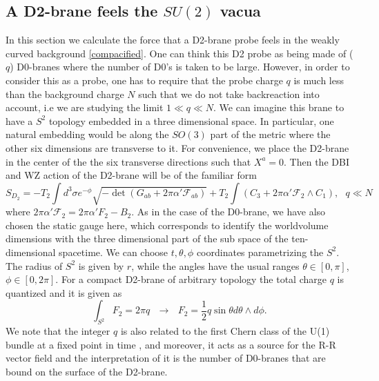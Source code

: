 \documentclass[11pt,english]{article}
\newcommand{\be}{\begin{equation}}
\newcommand{\ee}{\end{equation}}
\numberwithin{equation}{section}
\begin{document}
\subsection{A D2-brane feels the $SU(2)$ vacua}\label{D2analysis}
In this section we calculate the force that a D2-brane probe feels in the weakly curved background \eqref{compacified}. One can think this D2 probe as being made of ($q$) D0-branes where the number of D0's is taken to be large. However, in order to consider this as a probe, one has to require that the probe charge $q$ is much less than the background charge $N$ such that we do not take backreaction into account, i.e we are studying the limit $1\ll q\ll N$. We can imagine this brane to have a $S^2$ topology embedded in a three dimensional space. In particular, one natural embedding would be along the $SO(3)$ part of the metric where the other six dimensions are transverse to it. For convenience, we place the D2-brane in the center of the the six transverse directions such that $X^a=0$. Then the DBI and WZ action of the D2-brane will be of the familiar form 
\be \label{D2action}
S_{D_2}=-T_2\int d^3\sigma e^{-\phi}\sqrt{-\det\left(G_{ab}+2\pi\alpha'\mathcal{F}_{ab}\right)}+T_2\int\left(C_3+2\pi\alpha'\mathcal{F}_2\wedge C_1\right),~~~q\ll N
\ee    
where $2\pi\alpha'\mathcal{F}_2=2\pi\alpha'F_2-B_2$. As in the case of the D0-brane, we have also chosen the static gauge here, which corresponds to identify the worldvolume dimensions with the three dimensional part of the sub space of the ten-dimensional spacetime. We can choose $t,\theta, \phi$ coordinates parametrizing the $S^2$. The radius of $S^2$ is given by $r$, while the angles have the usual ranges $\theta\in [0,\pi]$, $\phi\in[0,2\pi]$. For a compact D2-brane of arbitrary topology the total  charge $q$ is quantized and it is given as  
\be 
\int_{S^2}F_2=2\pi q ~~~\longrightarrow~~~ F_2=\frac{1}{2}q\sin\theta d\theta\wedge d\phi.
\ee 
We note that the integer $q$ is also related to the first Chern class of the U(1) bundle at a fixed point in time \cite{Figueroa-OFarrill2000}, \cite{Stanciu2000} and moreover, it acts as a source for the R-R vector field and the interpretation of it is the number of D0-branes that are bound on the surface of the D2-brane. 
\end{document}
